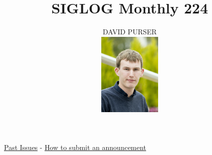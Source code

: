\documentclass[prodmode,acmtecs]{acmsmall} %
\newcounter{colstart}
\begin{document}
\setcounter{colstart}{\thepage}

\title{\huge\sc SIGLOG Monthly 224}
\author{DAVID PURSER
\vspace*{-2.6cm}\begin{flushright}\includegraphics[width=30mm]{dp}\end{flushright}
}

\maketitlee

\href{https://lics.siglog.org/newsletters/}{Past Issues}
 - 
\href{https://lics.siglog.org/newsletters/inst.html}{How to submit an announcement}
\end{document}
